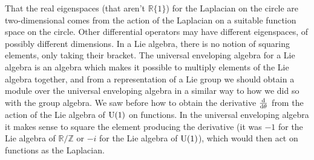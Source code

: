 \documentclass[../../rtnotes.tex]{subfiles}
\begin{document}
That the real eigenspaces (that aren't $\mathbb R\{1\}$) for the Laplacian on the circle are two-dimensional comes from the action of the Laplacian on a suitable function space on the circle. Other differential operators may have different eigenspaces, of possibly different dimensions. In a Lie algebra, there is no notion of squaring elements, only taking their bracket. The universal enveloping algebra for a Lie algebra is an algebra which makes it possible to multiply elements of the Lie algebra together, and from a representation of a Lie group we should obtain a module over the universal enveloping algebra in a similar way to how we did so with the group algebra. We saw before how to obtain the derivative $\dv{\theta}$ from the action of the Lie algebra of $\operatorname{U}(1)$ on functions. In the universal enveloping algebra it makes sense to square the element producing the derivative (it was $-1$ for the Lie algebra of $\mathbb R/\mathbb Z$ or $-i$ for the Lie algebra of $\operatorname{U}(1)$), which would then act on functions as the Laplacian.
\end{document}
